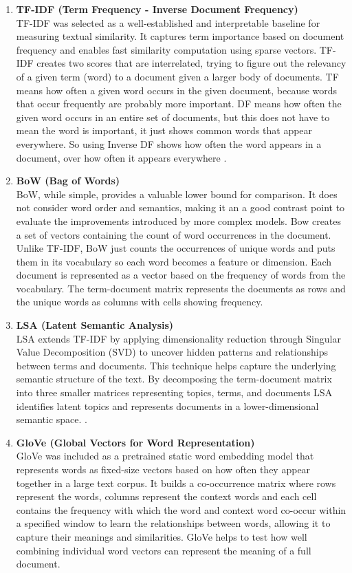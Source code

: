 \documentclass[\myFontSize,oneside,english,hidelinks,a4paper]{article}
\begin{document}
\begin{enumerate}
\item \textbf{TF-IDF (Term Frequency - Inverse Document Frequency)}\\
TF-IDF was selected as a well-established and interpretable baseline for measuring textual similarity. It captures term importance based on document frequency and enables fast similarity computation using sparse vectors.
TF-IDF creates two scores that are interrelated, trying to figure out the relevancy of a given term (word) to a document given a larger body of documents. TF means how often a given word occurs in the given document, because words that occur frequently are probably more important. DF means how often the given word occurs in an entire set of documents, but this does not have to mean the word is important, it just shows common words that appear everywhere. So using Inverse DF shows how often the word appears in a document, over how often it appears everywhere \cite{pub.1022525812}.


\item \textbf{BoW (Bag of Words)}\\
BoW, while simple, provides a valuable lower bound for comparison. It does not consider word order and semantics, making it an a good contrast point to evaluate the improvements introduced by more complex models.
Bow creates a set of vectors containing the count of word occurrences in the document. Unlike TF-IDF, BoW just counts the occurrences of unique words and puts them in its vocabulary so each word becomes a feature or dimension. Each document is represented as a vector based on the frequency of words from the vocabulary. The term-document matrix represents the documents as rows and the unique words as columns with cells showing frequency.
 

\item \textbf{LSA (Latent Semantic Analysis)}\\
LSA extends TF-IDF by applying dimensionality reduction through Singular Value Decomposition (SVD) to uncover hidden patterns and relationships between terms and documents. This technique helps capture the underlying semantic structure of the text. By decomposing the term-document matrix into three smaller matrices representing topics, terms, and documents LSA identifies latent topics and represents documents in a lower-dimensional semantic space. \cite{Bergamaschi2015247}.


\item \textbf{GloVe (Global Vectors for Word Representation)}\\
GloVe was included as a pretrained static word embedding model that represents words as fixed-size vectors based on how often they appear together in a large text corpus. It builds a co-occurrence matrix where rows represent the words, columns represent the context words and each cell contains the frequency with which the word and context word co-occur within a specified window to learn the relationships between words, allowing it to capture their meanings and similarities. GloVe helps to test how well combining individual word vectors can represent the meaning of a full document.



\end{enumerate}
\end{document}
